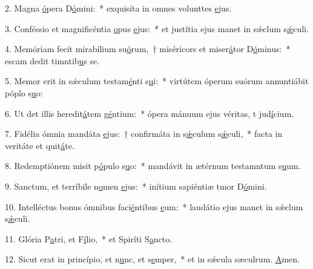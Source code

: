 2. Magna \uline{ó}pera D\uline{ó}mini:~* exquisíta in omnes volunttes \uline{e}jus.\par 
3. Conféssio et magnificéntia \uline{o}pus \uline{e}jus:~* et justítia ejus manet in sǽclum s\uline{ǽ}culi.\par 
4. Memóriam fecit mirabílium su\uline{ó}rum,~† miséricors et miser\uline{á}tor D\uline{ó}minus:~* escam dedit timntib\uline{u}s se.\par 
5. Memor erit in sǽculum testam\uline{é}nti s\uline{u}i:~* virtútem óperum suórum annuntiábit póplo s\uline{u}o:\par 
6. Ut det illis heredit\uline{á}tem g\uline{é}ntium:~* ópera mánuum ejus véritas, t jud\uline{í}cium.\par 
7. Fidélia ómnia mandáta \uline{e}jus:~† confirmáta in s\uline{ǽ}culum s\uline{ǽ}culi,~* facta in veritáte et quit\uline{á}te.\par 
8. Redemptiónem misit p\uline{ó}pulo s\uline{u}o:~* mandávit in ætérnum testamntum s\uline{u}um.\par 
9. Sanctum, et terríbile n\uline{o}men \uline{e}jus:~* inítium sapiéntiæ tmor D\uline{ó}mini.\par 
10. Intelléctus bonus ómnibus faci\uline{é}ntibus \uline{e}um:~* laudátio ejus manet in sǽclum s\uline{ǽ}culi.\par 
11. Glória P\uline{a}tri, et F\uline{í}lio,~* et Spiríti S\uline{a}ncto.\par 
12. Sicut erat in princípio, et n\uline{u}nc, et s\uline{e}mper,~* et in sǽcula sæculrum. \uline{A}men.\par 
